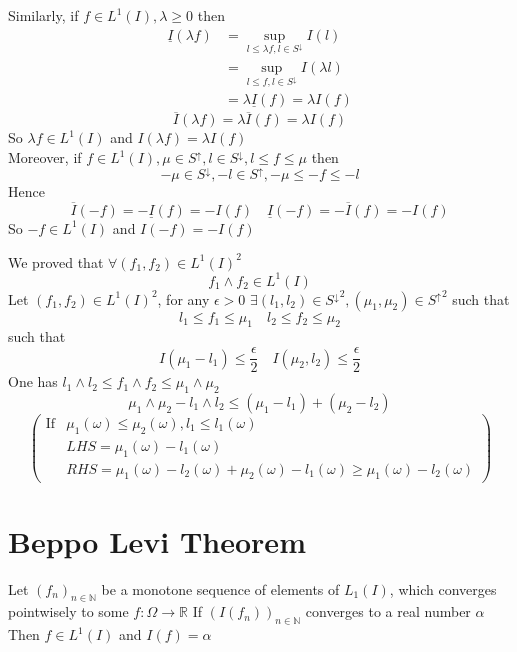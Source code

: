 \documentclass{book}
\begin{document}
Similarly, if $f\in L^1(I),\lambda\geq 0$ then 
$$
\begin{aligned}
    \underline{I}(\lambda f) &=\sup\limits_{l\leq\lambda f,l\in S^\downarrow}I(l)\\
    &= \sup\limits_{l\leq f,l\in S^\downarrow}I(\lambda l)\\
    &=\lambda\underline{I}(f)=\lambda I(f)
\end{aligned}$$
$$\overline{I}(\lambda f)=\lambda\overline{I}(f)=\lambda I(f)$$
So $\lambda f\in L^1(I)$ and $I(\lambda f)=\lambda I(f)$
\\Moreover, if $f\in L^1(I),\mu\in S^\uparrow,l\in S^\downarrow,l\leq f\leq \mu$ then 
$$-\mu\in S^\downarrow,-l\in S^\uparrow,-\mu\leq -f\leq -l$$
Hence $$\overline{I}(-f)=-\underline{I}(f)=-I(f)\quad \underline{I}(-f)=-\overline{I}(f)=-I(f)$$
So $-f\in L^1(I)$ and $I(-f)=-I(f)$

We proved that $\forall(f_1,f_2)\in L^1(I)^2$$$f_1\wedge f_2\in L^1(I)$$
Let $(f_1,f_2)\in L^1(I)^2$, for any $\epsilon>0$ $\exists(l_1,l_2)\in {S^\downarrow}^2,(\mu_1,\mu_2)\in {S^\uparrow}^2$ such that 
$$l_1\leq f_1\leq \mu_1\quad l_2\leq f_2\leq \mu_2$$
such that
$$I(\mu_1-l_1)\leq\frac{\epsilon}{2}\quad I(\mu_2,l_2)\leq\frac{\epsilon}{2}$$
One has $l_1\wedge l_2\leq f_1\wedge f_2\leq \mu_1\wedge \mu_2$
$$\mu_1\wedge \mu_2-l_1\wedge l_2\leq(\mu_1-l_1)+(\mu_2-l_2)$$
$$
\left(
\begin{aligned}
    \text{If} &\mu_1(\omega)\leq\mu_2(\omega),l_1\leq l_1(\omega)\\ &LHS=\mu_1(\omega)-l_1(\omega)\\ &RHS=\mu_1(\omega)-l_2(\omega)+\mu_2(\omega)-l_1(\omega)\geq \mu_1(\omega)-l_2(\omega)
\end{aligned}
\right)$$
\section{Beppo Levi Theorem}
Let $(f_n)_{n\in \mathbb{N}}$ be a monotone sequence of elements of $L_1(I)$, which converges pointwisely to some $f:\Omega\rightarrow \mathbb{R}$ If $(I(f_n))_{n\in \mathbb{N}}$ converges to a real number $\alpha$ Then $f\in L^1(I)$ and $I(f)=\alpha$
\end{document}

